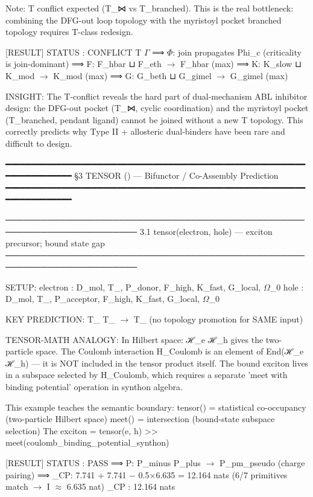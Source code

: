 \documentclass[12pt,a4paper]{article}
\begin{document}
Note: T conflict expected (T\_⋈ vs T\_branched). This is the real
bottleneck: combining the DFG-out loop topology with the myristoyl
pocket branched topology requires T-class redesign.

{[}RESULT{]}
STATUS  : CONFLICT
  T
  $\Gamma$
⟹  $\Phi$: join propagates Phi\_c (criticality is join-dominant)
⟹  F: F\_hbar ⊔ F\_eth $\rightarrow$ F\_hbar (max)
⟹  K: K\_slow ⊔ K\_mod $\rightarrow$ K\_mod (max)
⟹  G: G\_beth ⊔ G\_gimel $\rightarrow$ G\_gimel (max)

INSIGHT:
The T-conflict reveals the hard part of dual-mechanism ABL inhibitor
design: the DFG-out pocket (T\_⋈, cyclic coordination) and the
myristoyl pocket (T\_branched, pendant ligand) cannot be joined
without a new T topology. This correctly predicts why Type II +
allosteric dual-binders have been rare and difficult to design.

━━━━━━━━━━━━━━━━━━━━━━━━━━━━━━━━━━━━━━━━━━━━━━━━━━━━━━━━━━━━━━━━━━━━━━━━
§3  TENSOR  (\otimes)  ---  Bifunctor / Co-Assembly Prediction
━━━━━━━━━━━━━━━━━━━━━━━━━━━━━━━━━━━━━━━━━━━━━━━━━━━━━━━━━━━━━━━━━━━━━━━━

────────────────────────────────────────────────────────────────────────
3.1  tensor(electron, hole) --- exciton precursor; bound state gap
────────────────────────────────────────────────────────────────────────

SETUP:
electron : D\_mol, T\_\textbar{}, P\_donor,   F\_high, K\_fast, G\_local, $\Omega$\_0
hole     : D\_mol, T\_\textbar{}, P\_acceptor, F\_high, K\_fast, G\_local, $\Omega$\_0

KEY PREDICTION: T\_\textbar{} \otimes T\_\textbar{} $\rightarrow$ T\_\textbar{}  (no topology promotion for SAME input)

TENSOR-MATH ANALOGY:
In Hilbert space: ℋ\_e \otimes ℋ\_h gives the two-particle space.
The Coulomb interaction H\_Coulomb is an element of End(ℋ\_e \otimes ℋ\_h) ---
it is NOT included in the tensor product itself. The bound exciton
lives in a subspace selected by H\_Coulomb, which requires a separate
'meet with binding potential' operation in synthon algebra.

This example teaches the semantic boundary:
tensor()  = statistical co-occupancy (two-particle Hilbert space)
meet()    = intersection (bound-state subspace selection)
The exciton  = tensor(e, h) \textgreater{}\textgreater{} meet(coulomb\_binding\_potential\_synthon)

{[}RESULT{]}
STATUS  : PASS
⟹  P: P\_minus \otimes P\_plus $\rightarrow$ P\_pm\_pseudo (charge pairing)
⟹  \xi\_CP: 7.741 + 7.741 $-$ 0.5$\times$6.635 = 12.164 nats (6/7 primitives match $\rightarrow$ I $\approx$ 6.635 nat)
\xi\_CP    : 12.164 nats
\end{document}
